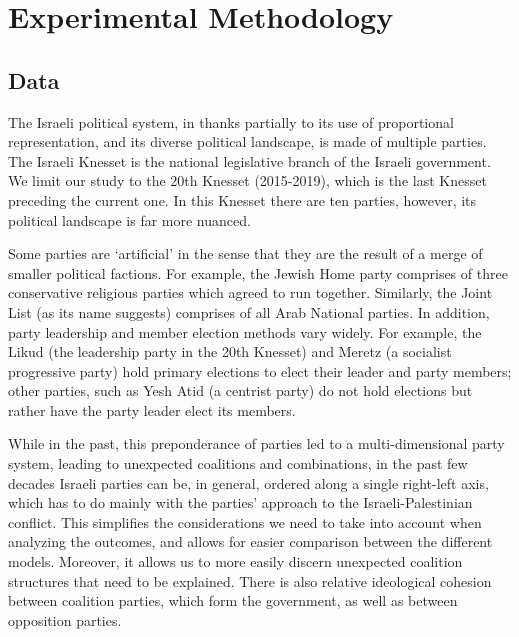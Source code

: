 
\chapter{Experimental Methodology}
\label{ch:experiment}
\vspace{2em}

\section{Data}
\label{sec:data}

The Israeli political system, in thanks partially to its use of
proportional representation, and its diverse political landscape, is made of multiple parties.
The Israeli Knesset is the national legislative branch of the Israeli government.
We limit our study to the 20th Knesset (2015-2019), which is the last
Knesset preceding the current one.
In this Knesset there are ten parties, however, its political landscape is far more nuanced.

Some parties are `artificial' in the sense that they are the result of a merge of smaller political factions. For example, the Jewish Home party comprises of three conservative religious parties which agreed to run together. Similarly, the Joint List (as its name suggests) comprises of all Arab National parties. 
In addition, party leadership and member election methods vary widely. For example, the Likud (the leadership party in the 20th Knesset) and Meretz (a socialist progressive party) hold primary elections to elect their leader and party members; other parties, such as Yesh Atid (a centrist party) do not hold elections but rather have the party leader elect its members. 

While in the past, this preponderance of parties led to a multi-dimensional
party system, leading to unexpected coalitions and combinations,
in the past few decades Israeli parties can be, in general,
ordered along a single right-left axis, which has to do mainly with
the parties' approach to the Israeli-Palestinian conflict.
This simplifies the considerations we need to take into account when analyzing
the outcomes, and allows for easier comparison between the different models.
Moreover, it allows us to more easily discern
unexpected coalition structures that need to be explained.
There is also relative ideological cohesion between coalition parties, which
form the government, as well as between opposition parties.

